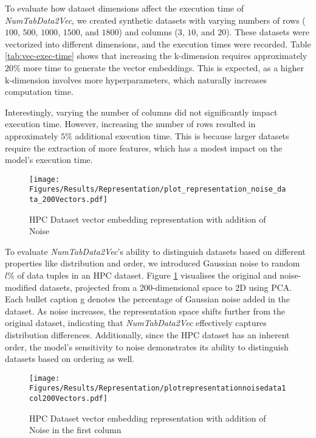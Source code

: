 To evaluate how dataset dimensions affect the execution time of \textit{NumTabData2Vec}, we created synthetic datasets with varying numbers of rows ($100$, $500$, $1000$, $1500$, and $1800$) and columns ($3$, $10$, and $20$). These datasets were vectorized into different dimensions, and the execution times were recorded. Table \ref{tab:vec-exec-time} shows that increasing the k-dimension requires approximately $20\%$ more time to generate the vector embeddings. This is expected, as a higher k-dimension involves more hyperparameters, which naturally increases computation time.

Interestingly, varying the number of columns did not significantly impact execution time. However, increasing the number of rows resulted in approximately $5\%$ additional execution time. This is because larger datasets require the extraction of more features, which has a modest impact on the model's execution time.

\begin{figure}[!ht]
    \centering
    \texttt{[image: Figures/Results/Representation/plot\_representation\_noise\_data\_200Vectors.pdf]}
    \caption{HPC Dataset vector embedding representation with addition of Noise}
    \label{fig:eval-nd-data-repr}
\end{figure}

To evaluate \textit{NumTabData2Vec}'s ability to distinguish datasets based on different properties like distribution and order, we introduced Gaussian noise to random $l\%$ of data tuples in an HPC dataset. Figure \ref{fig:eval-nd-data-repr} visualises the original and noise-modified datasets, projected from a 200-dimensional space to 2D using PCA. Each bullet caption g denotes the percentage of Gaussian noise added in the dataset. As noise increases, the representation space shifts further from the original dataset, indicating that \textit{NumTabData2Vec} effectively captures distribution differences. Additionally, since the HPC dataset has an inherent order, the model's sensitivity to noise demonstrates its ability to distinguish datasets based on ordering as well.

\begin{figure}[!ht]
    \centering
    \texttt{[image: Figures/Results/Representation/plotrepresentationnoisedata1col200Vectors.pdf]}
    \caption{HPC Dataset vector embedding representation with addition of Noise in the first column}
    \label{fig:eval-nd-data-repr-1col}
\end{figure}

